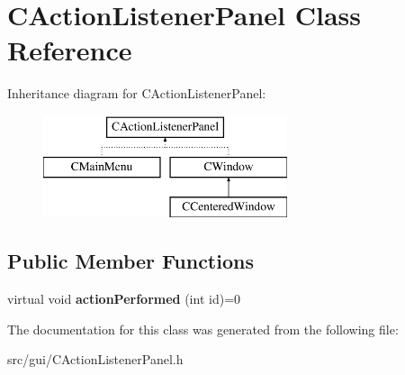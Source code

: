 \hypertarget{class_c_action_listener_panel}{
\section{CActionListenerPanel Class Reference}
\label{class_c_action_listener_panel}
}
Inheritance diagram for CActionListenerPanel:\begin{figure}[H]
\begin{center}
\leavevmode
\includegraphics[height=3.000000cm]{class_c_action_listener_panel}
\end{center}
\end{figure}
\subsection*{Public Member Functions}
\begin{DoxyCompactItemize}
\item 
\hypertarget{class_c_action_listener_panel_a95c59d1d1735c5312ffdffbb8c901281}{
virtual void {\bfseries actionPerformed} (int id)=0}
\label{class_c_action_listener_panel_a95c59d1d1735c5312ffdffbb8c901281}

\end{DoxyCompactItemize}


The documentation for this class was generated from the following file:\begin{DoxyCompactItemize}
\item 
src/gui/CActionListenerPanel.h\end{DoxyCompactItemize}
